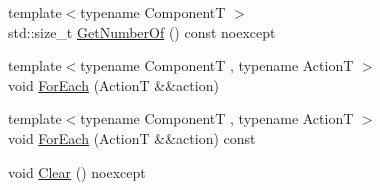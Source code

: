 \begin{DoxyCompactItemize}
\item 
{\footnotesize template$<$typename ComponentT $>$ }\\std\+::size\+\_\+t \mbox{\hyperlink{classmage_1_1rendering_1_1_world_a6bf09acab1791a6ebd6b46e5862f6373}{Get\+Number\+Of}} () const noexcept
\item 
{\footnotesize template$<$typename ComponentT , typename ActionT $>$ }\\void \mbox{\hyperlink{classmage_1_1rendering_1_1_world_a8ec9ac4bef64ec20111cd7cfddd4e379}{For\+Each}} (ActionT \&\&action)
\item 
{\footnotesize template$<$typename ComponentT , typename ActionT $>$ }\\void \mbox{\hyperlink{classmage_1_1rendering_1_1_world_a0461e3f09a19e4f6a64f77d04ac1b672}{For\+Each}} (ActionT \&\&action) const
\item 
void \mbox{\hyperlink{classmage_1_1rendering_1_1_world_ac04420d32e7cb0a28c33d7d451ca05cc}{Clear}} () noexcept
\end{DoxyCompactItemize}
